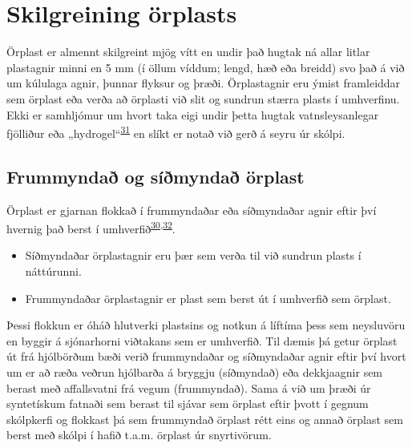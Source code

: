 \documentclass[icelandic,]{book}
\begin{document}
\hypertarget{skilgreining-orplasts}{%
\section*{Skilgreining örplasts}\label{skilgreining-orplasts}}

Örplast er almennt skilgreint mjög vítt en undir það hugtak ná allar litlar plastagnir minni en 5 mm (í öllum víddum; lengd, hæð eða breidd) svo það á við um kúlulaga agnir, þunnar flyksur og þræði. Örplastagnir eru ýmist framleiddar sem örplast eða verða að örplasti við slit og sundrun stærra plasts í umhverfinu. Ekki er samhljómur um hvort taka eigi undir þetta hugtak vatnsleysanlegar fjölliður eða „hydrogel``\textsuperscript{\protect\hyperlink{ref-Bergmann2015}{31}} en slíkt er notað við gerð á seyru úr skólpi.

\hypertarget{frummynda-og-simynda-orplast}{%
\subsection*{Frummyndað og síðmyndað örplast}\label{frummynda-og-simynda-orplast}}

Örplast er gjarnan flokkað í frummyndaðar eða síðmyndaðar agnir eftir því hvernig það berst í umhverfið\textsuperscript{\protect\hyperlink{ref-boucher2017primary}{30},\protect\hyperlink{ref-sundt2014sources}{32}}.

\begin{itemize}
\item
  Síðmyndaðar örplastagnir eru þær sem verða til við sundrun plasts í náttúrunni.
\item
  Frummyndaðar örplastagnir er plast sem berst út í umhverfið sem örplast.
\end{itemize}

Þessi flokkun er óháð hlutverki plastsins og notkun á líftíma þess sem neysluvöru en byggir á sjónarhorni viðtakans sem er umhverfið. Til dæmis þá getur örplast út frá hjólbörðum bæði verið frummyndaðar og síðmyndaðar agnir eftir því hvort um er að ræða veðrun hjólbarða á bryggju (síðmyndað) eða dekkjaagnir sem berast með affallsvatni frá vegum (frummyndað). Sama á við um þræði úr syntetískum fatnaði sem berast til sjávar sem örplast eftir þvott í gegnum skólpkerfi og flokkast þá sem frummyndað örplast rétt eins og annað örplast sem berst með skólpi í hafið t.a.m. örplast úr snyrtivörum.
\end{document}
